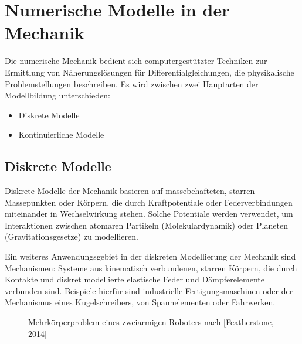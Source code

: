 \documentclass[letterpaper,10pt,german]{jupyterBook}
\let\sphinxpxdimen\pdfpxdimen\else\newdimen\sphinxpxdimen
\begin{document}
\sphinxstepscope


\section{Numerische Modelle in der Mechanik}
\label{\detokenize{chapters/chapter1/Einf_xfchrung_Modellklassifikation:numerische-modelle-in-der-mechanik}}\label{\detokenize{chapters/chapter1/Einf_xfchrung_Modellklassifikation::doc}}
\sphinxAtStartPar
Die numerische Mechanik bedient sich computergestützter Techniken zur Ermittlung von Näherungslösungen für Differentialgleichungen, die physikalische Problemstellungen beschreiben. Es wird zwischen zwei Hauptarten der Modellbildung unterschieden:
\begin{itemize}
\item {} 
\sphinxAtStartPar
Diskrete Modelle

\item {} 
\sphinxAtStartPar
Kontinuierliche Modelle

\end{itemize}




\subsection{Diskrete Modelle}
\label{\detokenize{chapters/chapter1/Einf_xfchrung_Modellklassifikation:diskrete-modelle}}
\sphinxAtStartPar
Diskrete Modelle der Mechanik basieren auf massebehafteten, starren Massepunkten oder Körpern, die durch Kraftpotentiale oder Federverbindungen miteinander in Wechselwirkung stehen. Solche Potentiale werden verwendet, um Interaktionen zwischen atomaren Partikeln (Molekulardynamik) oder Planeten (Gravitationsgesetze) zu modellieren.

\sphinxAtStartPar
Ein weiteres Anwendungsgebiet in der diskreten Modellierung der Mechanik sind Mechanismen: Systeme aus kinematisch verbundenen, starren Körpern, die durch Kontakte und diskret modellierte elastische Feder\sphinxhyphen{} und Dämpferelemente verbunden sind. Beispiele hierfür sind industrielle Fertigungsmaschinen oder der Mechanismus eines Kugelschreibers, von Spannelementen oder Fahrwerken.

\begin{figure}[htbp]
\centering
\capstart

\noindent\sphinxincludegraphics[height=300\sphinxpxdimen]{{MKS_Robot}.png}
\caption{Mehrkörperproblem eines zweiarmigen Roboters nach {[}\hyperlink{cite.quellen:id11}{Featherstone, 2014}{]}}\label{\detokenize{chapters/chapter1/Einf_xfchrung_Modellklassifikation:mks}}\end{figure}
\end{document}
